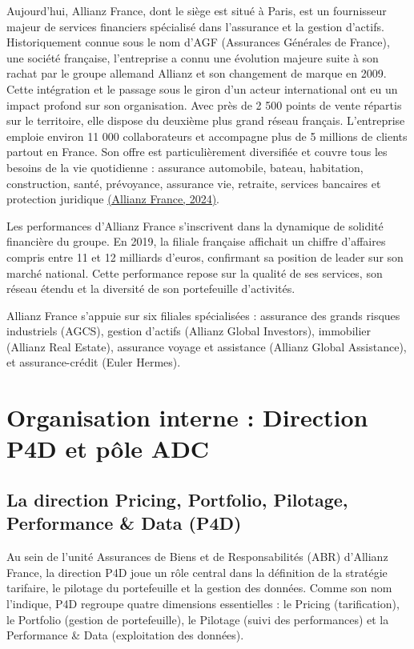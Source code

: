 Aujourd'hui, Allianz France, dont le siège est situé à Paris, est un fournisseur majeur de services financiers spécialisé dans l'assurance et la gestion d'actifs. Historiquement connue sous le nom d'AGF (Assurances Générales de France), une société française, l'entreprise a connu une évolution majeure suite à son rachat par le groupe allemand Allianz et son changement de marque en 2009. Cette intégration et le passage sous le giron d'un acteur international ont eu un impact profond sur son organisation. Avec près de 2 500 points de vente répartis sur le territoire, elle dispose du deuxième plus grand réseau français. L'entreprise emploie environ 11 000 collaborateurs et accompagne plus de 5 millions de clients partout en France. Son offre est particulièrement diversifiée et couvre tous les besoins de la vie quotidienne : assurance automobile, bateau, habitation, construction, santé, prévoyance, assurance vie, retraite, services bancaires et protection juridique \hyperlink{ref.allianz_france}{(Allianz France, 2024)}.

Les performances d'Allianz France s'inscrivent dans la dynamique de solidité financière du groupe. En 2019, la filiale française affichait un chiffre d'affaires compris entre 11 et 12 milliards d'euros, confirmant sa position de leader sur son marché national. Cette performance repose sur la qualité de ses services, son réseau étendu et la diversité de son portefeuille d'activités.

Allianz France s'appuie sur six filiales spécialisées : assurance des grands risques industriels (AGCS), gestion d'actifs (Allianz Global Investors), immobilier (Allianz Real Estate), assurance voyage et assistance (Allianz Global Assistance), et assurance-crédit (Euler Hermes).

\section{Organisation interne : Direction P4D et pôle ADC}

\subsection{La direction Pricing, Portfolio, Pilotage, Performance \& Data (P4D)}

Au sein de l'unité Assurances de Biens et de Responsabilités (ABR) d'Allianz France, la direction P4D joue un rôle central dans la définition de la stratégie tarifaire, le pilotage du portefeuille et la gestion des données. Comme son nom l'indique, P4D regroupe quatre dimensions essentielles : le Pricing (tarification), le Portfolio (gestion de portefeuille), le Pilotage (suivi des performances) et la Performance \& Data (exploitation des données).

